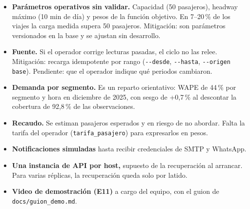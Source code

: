 \documentclass[10pt,a4paper]{article}
\newcommand{\cod}[1]{\texttt{\small #1}}
\begin{document}
\begin{itemize}
  \setlength{\itemsep}{0.1em}
  \item \textbf{Parámetros operativos sin validar.} Capacidad (50 pasajeros), headway máximo (10 min de día) y pesos de la función objetivo. En 7--20\,\% de los viajes la carga medida supera 50 pasajeros. Mitigación: son parámetros versionados en la base y se ajustan sin desarrollo.
  \item \textbf{Fuente.} Si el operador corrige lecturas pasadas, el ciclo no las relee. Mitigación: recarga idempotente por rango (\cod{-{}-desde}, \cod{-{}-hasta}, \cod{-{}-origen base}). Pendiente: que el operador indique qué periodos cambiaron.
  \item \textbf{Demanda por segmento.} Es un reparto orientativo: WAPE de 44\,\% por segmento y hora en diciembre de 2025, con sesgo de +0,7\,\% al descontar la cobertura de 92,8\,\% de las observaciones.
  \item \textbf{Recaudo.} Se estiman pasajeros esperados y en riesgo de no abordar. Falta la tarifa del operador (\cod{tarifa\_pasajero}) para expresarlos en pesos.
  \item \textbf{Notificaciones simuladas} hasta recibir credenciales de SMTP y WhatsApp.
  \item \textbf{Una instancia de API por host,} supuesto de la recuperación al arrancar. Para varias réplicas, la recuperación queda solo por latido.
  \item \textbf{Video de demostración (E11)} a cargo del equipo, con el guion de \cod{docs/guion\_demo.md}.
\end{itemize}
\end{document}
